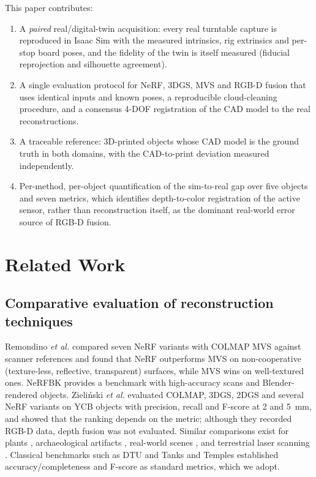 \documentclass[journal]{IEEEtran}
\begin{document}
This paper contributes:
\begin{enumerate}
\item A \emph{paired} real/digital-twin acquisition: every real turntable capture is reproduced in Isaac Sim
with the measured intrinsics, rig extrinsics and per-stop board poses, and the fidelity of the twin is
itself measured (fiducial reprojection and silhouette agreement).
\item A single evaluation protocol for NeRF, 3DGS, MVS and RGB-D fusion that uses identical inputs and known
poses, a reproducible cloud-cleaning procedure, and a consensus 4-DOF registration of the CAD model to the
real reconstructions.
\item A traceable reference: 3D-printed objects whose CAD model is the ground truth in both domains, with
the CAD-to-print deviation measured independently.
\item Per-method, per-object quantification of the sim-to-real gap over five objects and seven metrics,
which identifies depth-to-color registration of the active sensor, rather than reconstruction itself, as
the dominant real-world error source of RGB-D fusion.
\end{enumerate}

\section{Related Work}
\subsection{Comparative evaluation of reconstruction techniques}
Remondino \emph{et al.} \cite{remondino2023critical} compared seven NeRF variants with COLMAP MVS against
scanner references and found that NeRF outperforms MVS on non-cooperative (texture-less, reflective,
transparent) surfaces, while MVS wins on well-textured ones. NeRFBK \cite{karami2023nerfbk} provides a
benchmark with high-accuracy scans and Blender-rendered objects. Zieli\'nski \emph{et al.}
\cite{zielinski2026comparative} evaluated COLMAP, 3DGS, 2DGS and several NeRF variants on YCB objects with
precision, recall and F-score at 2 and 5~mm, and showed that the ranking depends on the metric; although
they recorded RGB-D data, depth fusion was not evaluated. Similar comparisons exist for plants
\cite{arshad2024plant}, archaeological artifacts \cite{rs2025archaeo}, real-world scenes \cite{isprs2025gs},
and terrestrial laser scanning \cite{jutzi2023tls}. Classical benchmarks such as DTU \cite{jensen2014dtu} and
Tanks and Temples \cite{knapitsch2017tanks} established accuracy/completeness and F-score as standard
metrics, which we adopt.
\end{document}
